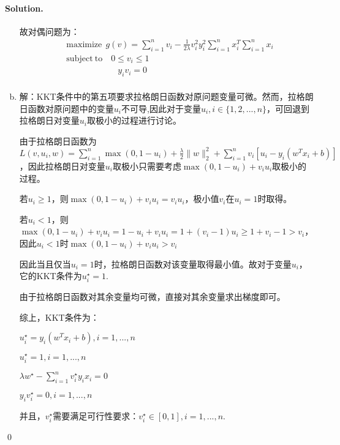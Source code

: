 \documentclass[a4paper]{article}
\newenvironment{solution}
{\color{blue} \paragraph{Solution.}}
{\newline \qed}
\begin{document}
\begin{solution}
\begin{enumerate}[a)]
                故对偶问题为：
                \begin{equation}
                    \begin{split}
                        &\text{maximize} \ \ g(v)=\sum_{i=1}^n v_i-\frac 1{2\lambda}v_i^2y_i^2\sum_{i=1}^nx_i^T\sum_{i=1}^nx_i\\
                        &\text{subject}\ \text{to}\quad 0\leq v_i\leq 1\\
                        &\quad \quad\quad\quad \quad\quad y_iv_i=0\\
                    \end{split}
                \end{equation}

        \item 解：KKT条件中的第五项要求拉格朗日函数对原问题变量可微。然而，拉格朗日函数对原问题中的变量$u_i$不可导,因此对于变量$u_i,i\in\{1, 2, ...,n\}$，可回退到拉格朗日对变量$u_i$取极小的过程进行讨论。

                由于拉格朗日函数为$L(v, u_i, w)=\sum_{i=1}^n\max(0, 1-u_i)+\frac \lambda 2\|w\|_2^2 + \sum_{i=1}^n v_i[u_i-y_i(w^Tx_i + b)]$，因此拉格朗日对变量$u_i$取极小只需要考虑$\max(0, 1-u_i)+v_iu_i$取极小的过程。

                若$u_i\geq 1$，则$\max(0, 1-u_i)+v_iu_i=v_iu_i$，极小值$v_i$在$u_i=1$时取得。

                若$u_i< 1$，则$\max(0, 1-u_i)+v_iu_i=1-u_i+v_iu_i=1+(v_i-1)u_i\geq 1+v_i-1> v_i$，因此$u_i<1$时$\max(0, 1-u_i)+v_iu_i>v_i$

                因此当且仅当$u_i=1$时，拉格朗日函数对该变量取得最小值。故对于变量$u_i$，它的KKT条件为$u_i^\star=1$.

                由于拉格朗日函数对其余变量均可微，直接对其余变量求出梯度即可。

                综上，KKT条件为：

                $u_i^\star=y_i(w^Tx_i+b), i=1, ...,n$

                $u_i^\star=1, i=1, ...,n$

                $\lambda w^\star-\sum_{i=1}^nv_i^\star y_ix_i=0$

                $y_iv_i^\star=0, i=1, ...,n$

                并且，$v_i^\star$需要满足可行性要求：$v_i^\star\in [0, 1], i=1, ...,n$.
    \end{enumerate}
\end{solution}
\end{document}
